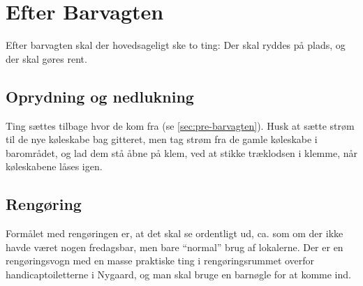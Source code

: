 \section{Efter Barvagten}
\label{sec:post-barvagten}

Efter barvagten skal der hovedsageligt ske to ting: Der skal ryddes på
plads, og der skal gøres rent.

\subsection{Oprydning og nedlukning}
\label{sec:post:oprydning}

Ting sættes tilbage hvor de kom fra (se
\autoref{sec:pre-barvagten}). 
Husk at sætte strøm til de nye køleskabe bag gitteret, 
men tag strøm fra de gamle køleskabe i barområdet, og lad dem stå åbne på
klem, ved at stikke træklodsen i klemme, når køleskabene låses igen.

\subsection{Rengøring}
\label{sec:post:rengoring}

Formålet med rengøringen er, at det skal se ordentligt ud, ca. som om
der ikke havde været nogen fredagsbar, men bare ``normal'' brug af
lokalerne. Der er en rengøringsvogn med en masse praktiske ting i
rengøringsrummet overfor handicaptoiletterne i Nygaard, 
og man skal bruge en barnøgle for at komme ind.

